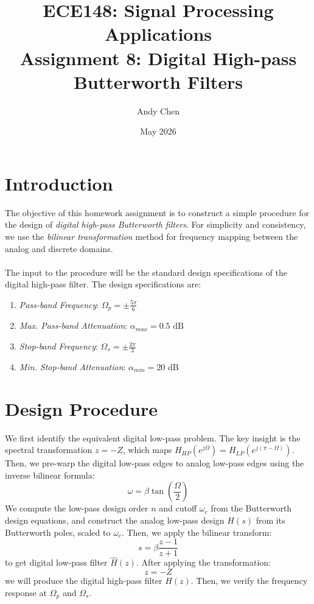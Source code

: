 \documentclass{article}
\title{ECE148: Signal Processing Applications \\ \large
        Assignment 8: Digital High-pass Butterworth Filters}
\author{Andy Chen}
\date{May 2026}
\begin{document}
\maketitle

\section{Introduction}
The objective of this homework assignment is to construct a simple procedure for the design of \textit{digital high-pass Butterworth filters}. For simplicity and consistency, we use the \textit{bilinear transformation} method for frequency mapping between the analog and discrete domains.
\\
\\
The input to the procedure will be the standard design specifications of the digital high-pass filter. The design specifications are:
\begin{enumerate}[label=\alph*.,leftmargin=2cm, rightmargin=2cm]
    \item \textit{Pass-band Frequency}: \hfill \(\Omega_p=\pm\frac{5\pi}{6}\)
    \item \textit{Max. Pass-band Attenuation}: \hfill \(\alpha_{max}=0.5\text{ dB}\)
    \item \textit{Stop-band Frequency}: \hfill \(\Omega_s=\pm\frac{2\pi}{3}\)
    \item \textit{Min. Stop-band Attenuation}: \hfill \(\alpha_{min}=20\text{ dB}\)
\end{enumerate}

\section{Design Procedure}
We first identify the equivalent digital low-pass problem. The key insight is the spectral transformation \(z=-Z\), which maps \(H_{HP}(e^{j\Omega}) = H_{LP}(e^{j(\pi-\Omega)})\). Then, we pre-warp the digital low-pass edges to analog low-pass edges using the inverse bilinear formula: 
\[\omega=\beta\tan(\frac{\Omega}{2})\]
We compute the low-pass design order \(n\) and cutoff \(\omega_c\) from the Butterworth design equations, and construct the analog low-pass design \(H(s)\) from its Butterworth poles, scaled to \(\omega_c\). Then, we apply the bilinear transform:
\[
s=\beta\frac{z-1}{z+1}
\]
to get digital low-pass filter \(\hat{H}(z)\). After applying the transformation:
\[
z=-Z
\]
we will produce the digital high-pass filter \(H(z)\). Then, we verify the frequency response at \(\Omega_p\) and \(\Omega_s\).
\end{document}
